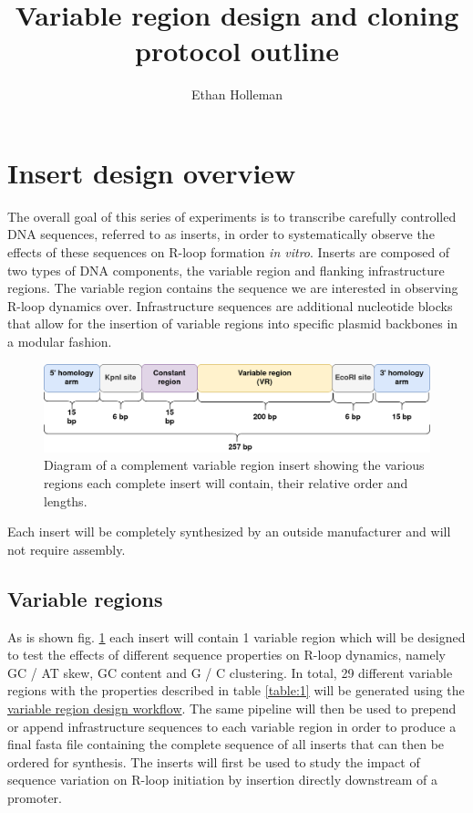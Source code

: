 \documentclass[11pt]{article}
\author{Ethan Holleman}
\title{Variable region design and cloning protocol outline}
\begin{document}
\maketitle


\section{Insert design overview}

The overall goal of this series of experiments is to transcribe carefully controlled DNA sequences, referred to as inserts, in order to systematically observe the effects of these sequences on R-loop formation \emph{in vitro}. Inserts are composed of two types of DNA components, the variable region and flanking infrastructure regions. The variable region contains the sequence we are interested in observing R-loop dynamics over. Infrastructure sequences are additional nucleotide blocks that allow for the insertion of variable regions into specific plasmid backbones in a modular fashion. 

\begin{figure}[h]
	\includegraphics[width=16cm]{images/variable_region_diagram.png}
	\centering
	\caption{Diagram of a complement variable region insert showing the various regions each complete insert will contain, their relative order and lengths.}
	\label{fig:1}
\end{figure}

Each insert will be completely synthesized by an outside manufacturer and will not require assembly. 

\subsection{Variable regions}

As is shown fig. \ref{fig:1} each insert will contain 1 variable region which will be designed to test the effects of different sequence properties on R-loop dynamics, namely GC / AT skew, GC content and G / C clustering. In total, 29 different variable regions with the properties described in table \ref{table:1} will be generated using the \href{https://github.com/EthanHolleman/plasmid-VR-design}{variable region design workflow}. The same pipeline will then be used to prepend or append infrastructure sequences to each variable region in order to produce a final fasta file containing the complete sequence of all inserts that can then be ordered for synthesis. The inserts will first be used to study the impact of sequence variation on R-loop initiation by insertion directly downstream of a promoter.
\end{document}
